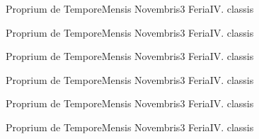 \documentclass[liber-responsorialis_temporale.tex]{subfiles}
\begin{document}
\sixlinesvspace

	{Proprium de Tempore}{Mensis Novembris}{3}{}
	{Feria}{IV. classis}{}
	{}
	{}

	{Proprium de Tempore}{Mensis Novembris}{3}{}
	{Feria}{IV. classis}{}
	{}
	{}
\pagebreak
\sixlinesvspace
{}
\sixlinesvspace
\pagebreak

	{Proprium de Tempore}{Mensis Novembris}{3}{}
	{Feria}{IV. classis}{}
	{}
	{}
\pagebreak
{}

	{Proprium de Tempore}{Mensis Novembris}{3}{}
	{Feria}{IV. classis}{}
	{}
	{}

	{Proprium de Tempore}{Mensis Novembris}{3}{}
	{Feria}{IV. classis}{}
	{}
	{}

	{Proprium de Tempore}{Mensis Novembris}{3}{}
	{Feria}{IV. classis}{}
	{}
	{}
\end{document}
